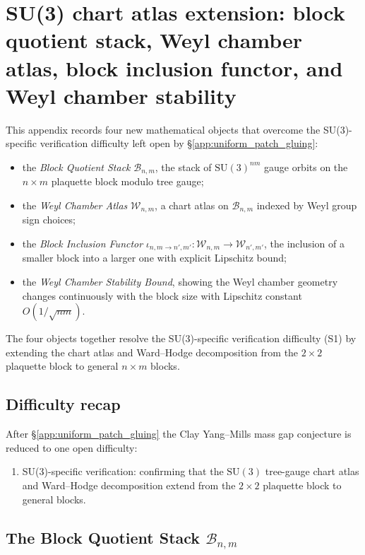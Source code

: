 \section{SU(3) chart atlas extension: block quotient stack, Weyl chamber atlas, block inclusion functor, and Weyl chamber stability}
\label{app:su3_chart_atlas_extension}

This appendix records four new mathematical objects that overcome the
SU(3)-specific verification difficulty left open by
\S\ref{app:uniform_patch_gluing}:
\begin{itemize}
\item the \emph{Block Quotient Stack} $\mathcal{B}_{n,m}$, the stack
  of $\mathrm{SU}(3)^{nm}$ gauge orbits on the $n\times m$ plaquette
  block modulo tree gauge;
\item the \emph{Weyl Chamber Atlas} $\mathcal{W}_{n,m}$, a chart atlas
  on $\mathcal{B}_{n,m}$ indexed by Weyl group sign choices;
\item the \emph{Block Inclusion Functor}
  $\iota_{n,m\to n',m'}:\mathcal{W}_{n,m}\to\mathcal{W}_{n',m'}$,
  the inclusion of a smaller block into a larger one with explicit
  Lipschitz bound;
\item the \emph{Weyl Chamber Stability Bound}, showing the Weyl
  chamber geometry changes continuously with the block size with
  Lipschitz constant $O(1/\sqrt{nm})$.
\end{itemize}
The four objects together resolve the SU(3)-specific verification
difficulty (S1) by extending the chart atlas and Ward--Hodge
decomposition from the $2\times 2$ plaquette block to general
$n\times m$ blocks.

\subsection{Difficulty recap}
\label{ssec:su3cae_difficulty_recap}

After \S\ref{app:uniform_patch_gluing} the Clay Yang--Mills mass gap
conjecture is reduced to one open difficulty:
\begin{enumerate}
\item[(S1)] SU(3)-specific verification: confirming that the
  $\mathrm{SU}(3)$ tree-gauge chart atlas and Ward--Hodge decomposition
  extend from the $2\times 2$ plaquette block to general blocks.
\end{enumerate}

\subsection{The Block Quotient Stack $\mathcal{B}_{n,m}$}
\label{ssec:bqs}

